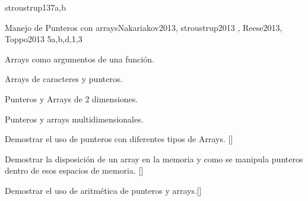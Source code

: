 \begin{syllabus}
\begin{unit}{\PLObjectOrientedProgramming}{}{stroustrup13}{7}{a,b}
\begin{topics}
	\item \PLObjectOrientedProgrammingTopicObject
	\item \PLObjectOrientedProgrammingTopicDefinition
	\item \PLObjectOrientedProgrammingTopicSubclasses
	\item \PLObjectOrientedProgrammingTopicDynamic
	\item \PLObjectOrientedProgrammingTopicSubtyping
	\item \PLObjectOrientedProgrammingTopicObjectOriented
	\item \PLObjectOrientedProgrammingTopicUsing
\end{topics}

\begin{learningoutcomes}
	\item \PLObjectOrientedProgrammingLODesignAndClass [\Usage]
	\item \PLObjectOrientedProgrammingLOUseSubclassing [\Usage]
	\item \PLObjectOrientedProgrammingLOCorrectly [\Usage]
	\item \PLObjectOrientedProgrammingLOCompareAndThe [\Usage]
	\item \PLObjectOrientedProgrammingLOExplainTheObject [\Usage] 
	\item \PLObjectOrientedProgrammingLOUseObject [\Usage]
	\item \PLObjectOrientedProgrammingLODefineAndAnd [\Usage]
\end{learningoutcomes}
\end{unit}

\begin{unit}{Manejo de Punteros con arrays}{}{Nakariakov2013, stroustrup2013 , Reese2013, Toppo2013 }{5}{a,b,d,1,3}
\begin{topics}
	\item Arrays como argumentos de una función.
	\item Arrays de caracteres y punteros.
	\item Punteros y Arrays de 2 dimensiones.
	\item Punteros y arrays multidimensionales.
\end{topics}

\begin{learningoutcomes}
	\item Demostrar el uso de punteros con diferentes tipos de Arrays. [\Usage]
	\item Demostrar la disposición de un array en la memoria y como se manipula punteros dentro de esos espacios de memoria. [\Usage]
	\item Demostrar el uso de aritmética de punteros y arrays.[\Usage]
\end{learningoutcomes}
\end{unit}


\end{syllabus}
